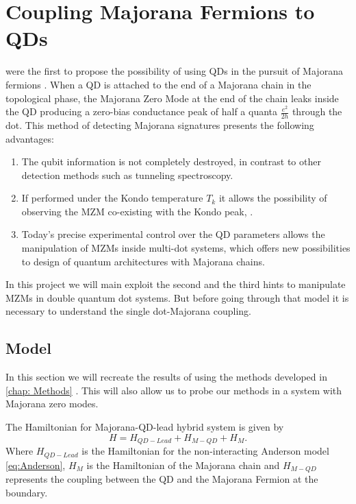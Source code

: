 
\section{Coupling Majorana Fermions to QDs}
\citeauthor{liu_detecting_2011} were the first to propose the possibility of using QDs in the pursuit of Majorana fermions . When a QD is attached to the end of a Majorana chain in the topological phase,  the Majorana Zero Mode at the end of the chain leaks inside the QD \cite{vernek_subtle_2014} producing a zero-bias conductance peak of half a quanta $\frac{e^{2}}{2h}$ through the dot.  This method of detecting Majorana signatures presents the following  advantages:

\begin{enumerate}
\item The qubit information  is not completely destroyed, in contrast to other detection methods such as tunneling spectroscopy.
\item If performed under the  Kondo temperature $T_k$ it allows the possibility of observing the  MZM co-existing with the Kondo peak, \cite{lee_kondo_2013,ruiz-tijerina_interaction_2015,gorski_interplay_2018} .
\item Today’s precise experimental control over the QD parameters allows the manipulation of MZMs inside multi-dot systems, which offers new possibilities to design of quantum architectures with Majorana chains.\cite{barkeshli_physical_2015,karzig_scalable_2017} 
\end{enumerate}

In this project we will main exploit the second and the third hints to manipulate MZMs in double quantum dot systems. But before going through that model it is necessary to understand the single dot-Majorana coupling.

\subsection{Model}


In this section we will recreate the results of \citeauthor{liu_detecting_2011} using the methods developed in \ref{chap: Methods} . This will also allow us to probe our methods in a system with Majorana zero modes. 

The Hamiltonian for Majorana-QD-lead hybrid system is  given by
\begin{equation}
    H=H_{QD-Lead}+H_{M-QD}+H_M.
\end{equation}
Where $H_{QD-Lead}$ is the Hamiltonian for the non-interacting Anderson model \eqref{eq:Anderson}, $H_M$ is the Hamiltonian of the Majorana chain and $H_{M-QD}$ represents the coupling between the QD and the Majorana Fermion at the boundary.

